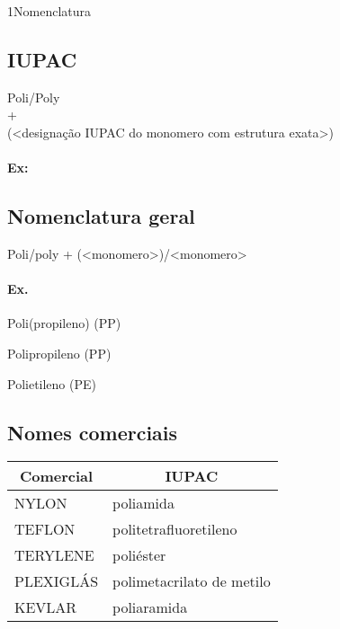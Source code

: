 \documentclass[\mainfilename]{subfiles}
\begin{document}
\begin{sectionBox}1{Nomenclatura} %
    
    \subsection{IUPAC}
    \begin{center}\large
        Poli/Poly\\+\\(<designação IUPAC do monomero com estrutura exata>)
    \end{center}
    \paragraph*{Ex:} 
    \subsection{Nomenclatura geral}
    \begin{center}\large
        Poli/poly + (<monomero>)/<monomero>
    \end{center}
    \paragraph*{Ex.}
    \begin{itemize}
        \begin{multicols}{3 }
            \item Poli(propileno) (PP)
            \item Polipropileno (PP)
            \item Polietileno (PE)
        \end{multicols}
    \end{itemize}

    \subsection{Nomes comerciais}
    \begin{center}
        \vspace{1ex}
        \begin{tabular}{l l}
            \toprule
            
                \multicolumn{1}{c}{Comercial}
                & \multicolumn{1}{c}{IUPAC}
            
            \\\midrule
            
               NYLON    & poliamida
            \\ TEFLON   & politetrafluoretileno
            \\ TERYLENE & poliéster
            \\ PLEXIGLÁS& polimetacrilato de metilo
            \\ KEVLAR   & poliaramida
            
            \\\bottomrule
        \end{tabular}
        \vspace{2ex}
    \end{center}
    
\end{sectionBox}
\end{document}
